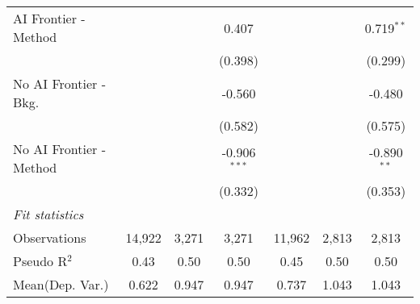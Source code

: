 \begin{tabular}{lcccccc}
   AI Frontier - Method    &                &         & 0.407          &                &             & 0.719$^{**}$\\   
                           &                &         & (0.398)        &                &             & (0.299)\\   
   No AI Frontier - Bkg.   &                &         & -0.560         &                &             & -0.480\\   
                           &                &         & (0.582)        &                &             & (0.575)\\   
   No AI Frontier - Method &                &         & -0.906$^{***}$ &                &             & -0.890$^{**}$\\   
                           &                &         & (0.332)        &                &             & (0.353)\\   
   \midrule
   \emph{Fit statistics}\\
   Observations            & 14,922         & 3,271   & 3,271          & 11,962         & 2,813       & 2,813\\  
   Pseudo R$^2$            & 0.43           & 0.50    & 0.50           & 0.45           & 0.50        & 0.50\\  
Mean(Dep. Var.) & 0.622 & 0.947 & 0.947 & 0.737 & 1.043 & 1.043 \\
   

\end{tabular}
